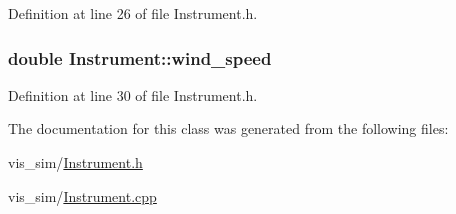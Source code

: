 Definition at line 26 of file Instrument.h.

\hypertarget{classInstrument_a7e18ced4e4e556e5203c046c2ebb3c63}{
\subsubsection[{wind\_\-speed}]{\setlength{\rightskip}{0pt plus 5cm}double {\bf Instrument::wind\_\-speed}}}
\label{classInstrument_a7e18ced4e4e556e5203c046c2ebb3c63}


Definition at line 30 of file Instrument.h.



The documentation for this class was generated from the following files:\begin{DoxyCompactItemize}
\item 
vis\_\-sim/\hyperlink{Instrument_8h}{Instrument.h}\item 
vis\_\-sim/\hyperlink{Instrument_8cpp}{Instrument.cpp}\end{DoxyCompactItemize}
